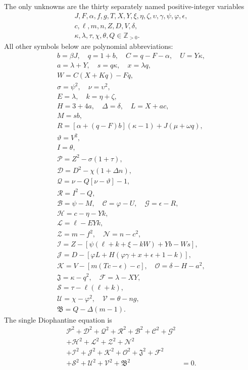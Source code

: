 The only unknowns are the thirty separately named positive-integer variables
\[
\begin{gathered}J,F,\alpha,f,g,T,X,Y,\xi,\eta,\zeta,\upsilon,\gamma,\psi,\varphi,\epsilon,\\
c,\ell,m,n,Z,D,V,\delta,\\
\kappa,\lambda,\tau,\chi,\theta,Q\in\mathbb Z_{>0}.\end{gathered}
\]
All other symbols below are polynomial abbreviations:
\[
\begin{gathered}
b=\beta J,\quad q=1+b,\quad C=q-F-\alpha,\quad U=Y\kappa,\\
a=\lambda+Y,\quad s=q\kappa,\quad x=\lambda q,\\
W=C(X+Kq)-Fq,\\
\sigma=\psi^2,\quad\nu=\upsilon^2,\\
E=\lambda,\quad k=\eta+\zeta,\\
H=3+4a,\quad\Delta=\delta,\quad L=X+ac,\\
M=sb,\\
R=[\alpha+(q-F)b](\kappa-1)+J(\mu+\omega q),\\
\vartheta=V^2,\\
I=\theta,\\
\mathcal{P}=Z^2-\sigma(1+\tau),\\
\mathcal{D}=D^2-\chi(1+\Delta n),\\
\mathcal{Q}=\nu-Q[\nu-\vartheta]-1,\\
\mathcal{R}=I^2-Q,\\
\mathcal{B}=\psi-M,\quad \mathcal{C}=\varphi-U,\quad \mathcal{G}=\epsilon-R,\\
\mathcal{H}=c-\eta-Yk,\\
\mathcal{L}=\ell-EYk,\\
\mathcal{Z}=m-f^2,\quad \mathcal{N}=n-c^2,\\
\mathcal{I}=Z-[\psi(\ell+k+\xi-kW)+Yb-Ws],\\
\mathcal{J}=D-[\varphi L+H(\varphi\gamma+x+\epsilon+1-k)],\\
\mathcal{K}=V-[m(Tc-\epsilon)-c],\quad\mathcal{O}=\delta-H-a^2,\\
\mathfrak{J}=\kappa-q^2,\quad\mathcal{F}=\lambda-XY,\\
\mathcal{S}=\tau-\ell(\ell+k),\\
\mathcal{U}=\chi-\varphi^2,\quad\mathcal{V}=\theta-ng,\\
\mathfrak{B}=Q-\Delta(m-1).
\end{gathered}
\]
The single Diophantine equation is
\[
\begin{split}
\mathcal{P}^2+\mathcal{D}^2+\mathcal{Q}^2+\mathcal{R}^2+\mathcal{B}^2+\mathcal{C}^2+\mathcal{G}^2 &\\
+\mathcal{H}^2+\mathcal{L}^2+\mathcal{Z}^2+\mathcal{N}^2 &\\
+\mathcal{I}^2+\mathcal{J}^2+\mathcal{K}^2+\mathcal{O}^2+\mathfrak{J}^2+\mathcal{F}^2 &\\
+\mathcal{S}^2+\mathcal{U}^2+\mathcal{V}^2+\mathfrak{B}^2 &= 0.
\end{split}
\]
